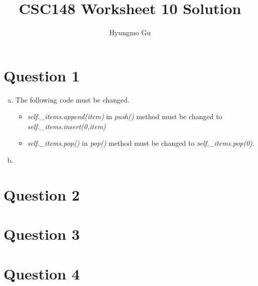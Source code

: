 \documentclass[12pt]{article}
\begin{document}
\title{CSC148 Worksheet 10 Solution}
\author{Hyungmo Gu}
\maketitle

\section*{Question 1}
\begin{enumerate}[a.]
    \item

    The following code must be changed.

    \begin{itemize}
        \item \textit{self.\_items.append(item)} in \textit{push()} method must
        be changed to \textit{self.\_items.insert(0,item)}
        \item \textit{self.\_items.pop()} in \textit{pop()} method must be changed
        to \textit{self.\_items.pop(0)}.
    \end{itemize}

    \item

\end{enumerate}

\section*{Question 2}

\section*{Question 3}

\section*{Question 4}
\end{document}
